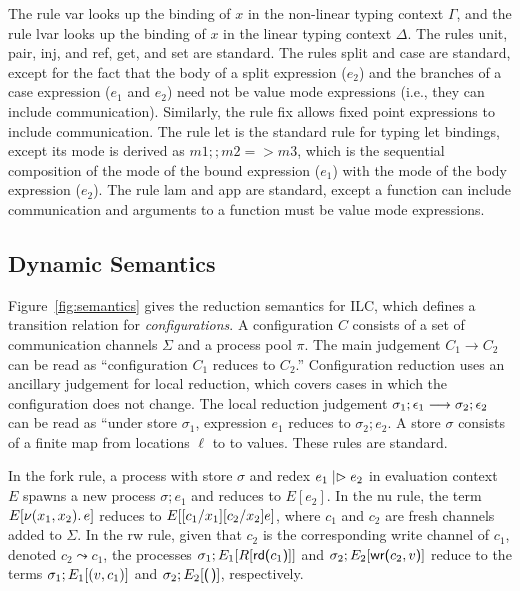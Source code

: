 The rule var looks up the binding of $x$ in the non-linear typing context $\Gamma$,
and the rule lvar looks up the binding of $x$ in the linear typing context
$\Delta$. The rules unit, pair, inj, and ref, get, and set are standard. The rules
split and case are standard, except for the fact that the body of a
\textsf{split} expression ($e_2$) and the branches of a \textsf{case} expression
($e_1$ and $e_2$) need not be value mode expressions (i.e., they can include
communication). Similarly, the rule fix allows fixed point expressions to
include communication. The rule let is the standard rule for typing let
bindings, except its mode is derived as $m1 ;; m2 => m3$, which is the
sequential composition of the mode of the bound expression ($e_1$) with the mode
of the body expression ($e_2$). The rule lam and app are standard, except a
function can include communication and arguments to a function must be value
mode expressions.



\subsection{Dynamic Semantics}
\label{subsec:semantics}



Figure~\ref{fig:semantics} gives the reduction semantics for ILC, which defines
a transition relation for \emph{configurations}. A configuration $C$ consists of
a set of communication channels $\Sigma$ and a process pool $\pi$. The main judgement
$C_1 \longrightarrow C_2$ can be read as ``configuration $C_1$ reduces to $C_2$.''
Configuration reduction uses an ancillary judgement for local reduction, which
covers cases in which the configuration does not change. The local reduction
judgement $\sigma_1; \epsilon_1 \longrightarrow \sigma_2; \epsilon_2$ can be read as ``under store $\sigma_1$,
expression $e_1$ reduces to $\sigma_{2}; e_2$. A store $\sigma$ consists of a finite map
from locations $\ell$ to to values. These rules are standard.

In the fork rule, a process with store $\sigma$ and redex $e_1 \mathrel{|\rhd} e_2$ in
evaluation context $E$ spawns a new process $\sigma; e_1$ and reduces to $E[e_2]$. In
the nu rule, the term $E[ \nu(x_1, x_2).\,e ]$ reduces to $E[
  [c_1/x_1][c_2/x_2]e ]$, where $c_1$ and $c_2$ are fresh
channels added to $\Sigma$. In the rw rule, given that $c_2$ is the corresponding
write channel of $c_1$, denoted $c_2 \leadsto c_1$, the processes $\sigma_1 ; E_1[R[
    \text{\textsf{rd}}\textsf{(}{c_1}\textsf{)}] ]$ and $\sigma_2 ; E_2[ \text{\textsf{wr}}\textsf{(}{c_2},{v}\textsf{)}]$ reduce to the
terms $\sigma_1 ; E_1[ (v, c_1)]$ and $\sigma_2 ; E_2[ \eUnit]$, respectively.

\begin{comment}






\end{comment}


